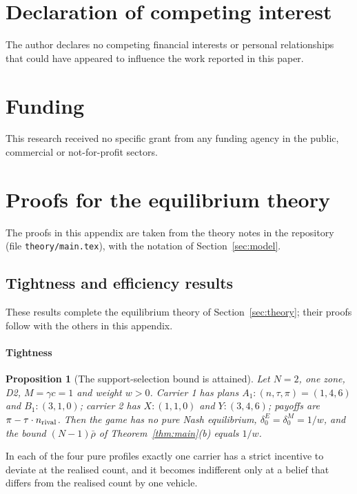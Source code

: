 \documentclass[preprint,12pt]{elsarticle}
\newtheorem{proposition}[theorem]{Proposition}
\theoremstyle{definition}
\theoremstyle{remark}
\begin{document}
\section*{Declaration of competing interest}
The author declares no competing financial interests or personal relationships that could have appeared to influence the work reported in this paper.

\section*{Funding}
This research received no specific grant from any funding agency in the public, commercial or not-for-profit sectors.





\appendix
\section{Proofs for the equilibrium theory}\label{app:proofs}

The proofs in this appendix are taken from the theory notes in the repository (file \texttt{theory/main.tex}), with the notation of Section~\ref{sec:model}.

\subsection{Tightness and efficiency results}\label{app:tightness}

These results complete the equilibrium theory of Section~\ref{sec:theory}; their proofs follow with the others in this appendix.

\paragraph{Tightness}

\begin{proposition}[The support-selection bound is attained]\label{prop:tight}
Let $N=2$, one zone, D2, $M=\gamma c=1$ and weight $w>0$. Carrier 1 has plans $A_1:(n,\tau,\pi)=(1,4,6)$ and $B_1:(3,1,0)$; carrier 2 has $X:(1,1,0)$ and $Y:(3,4,6)$; payoffs are $\pi-\tau\cdot n_{\rm rival}$. Then the game has no pure Nash equilibrium, $\delta_0^E=\delta_0^M=1/w$, and the bound $(N-1)\bar\rho$ of Theorem~\ref{thm:main}(b) equals $1/w$.
\end{proposition}

In each of the four pure profiles exactly one carrier has a strict incentive to deviate at the realised count, and it becomes indifferent only at a belief that differs from the realised count by one vehicle.
\end{document}
